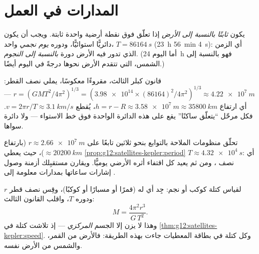 \section{المدارات في العمل}

\begin{definition}\label{def:g12:satellites-kepler:geo}
يكون  \emph{ثابتًا بالنسبة إلى الأرض} إذا
تعلّق فوق نقطة أرضية واحدة ثابتة. ويجب أن يكون 
دائريًّا استوائيًّا، ودوره \emph{يوم نجمي}
واحد، $T = \qty{86164}{s}$ (\qty{23}{h}
\qty{56}{min} \qty{4}{s}): أي الزمن الذي تدور فيه الأرض دورة
\emph{بالنسبة إلى النجوم}. (أما اليوم \qty{24}{h} فهو بالنسبة إلى
الشمس، التي تتقدم الأرض نحوها درجةً في اليوم أيضًا.)
\end{definition}

\begin{example}\label{ex:g12:satellites-kepler:geoalt}
قانون كبلر الثالث، مقروءًا معكوسًا، يملي نصف القطر:
$r = \left(GMT^2/4\pi^2\right)^{1/3} =
\left(\num{3.98e14} \times (\num{86164})^2/4\pi^2\right)^{1/3}
\approx \qty{4.22e7}{m}$ --- أي ارتفاع $h = r - R \approx
\qty{3.58e7}{m} \approx \qty{35800}{km}$، يُقطع  $v = 2\pi r/T
\approx \qty{3.1}{km/s}$. فكل مرحّل ``يتعلّق ساكنًا'' يقع على
هذه الدائرة الواحدة فوق خط الاستواء --- ولا دائرة سواها.
\end{example}

\begin{example}\label{ex:g12:satellites-kepler:gps}
تحلّق منظومات الملاحة بالتوابع بنحو ثلاثين تابعًا على
$r \approx \qty{2.66e7}{m}$ (بارتفاع $\approx \qty{20200}{km}$)،
حيث يعطي \cref{prop:g12:satellites-kepler:period}  $T \approx
\qty{4.32e4}{s}$: أي نصف ، ومن ثم يعيد كل  اقتفاء
أثره الأرضي يوميًّا. ويقارن مستقبِلك أزمنة وصول
إشارات ساعاتها بمدارات معلومة إلى .
\end{example}

\begin{method}\label{met:g12:satellites-kepler:weigh}
%
لقياس كتلة كوكب أو نجم: جِد أي  له
(قمرًا أو مسبارًا أو كوكبًا)، وقِس نصف قطر  $r$ ودوره
$T$، واقلب القانون الثالث:
\[ M = \frac{4\pi^2 r^3}{G\,T^2}. \]
وهذا لا يزن إلا الجسم \emph{المركزي} --- إذ تلاشت كتلة 
في \cref{thm:g12:satellites-kepler:speed}. وكل كتلة في بطاقة
المعطيات جاءت بهذه الطريقة: فالأرض من القمر، والشمس من
 الأرض نفسه.
\end{method}

